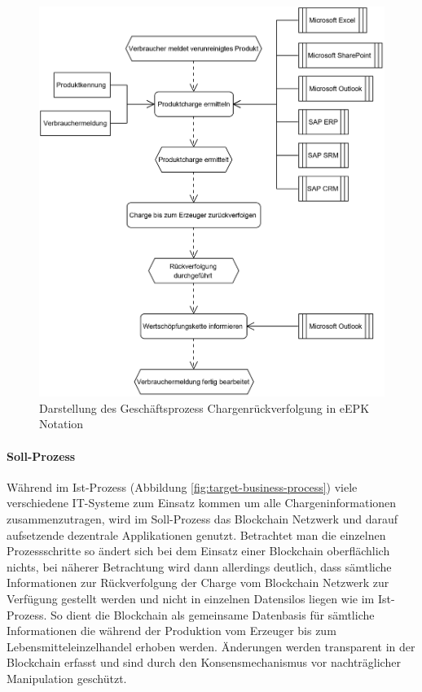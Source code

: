 \begin{figure}[H]
	\centering
	\includegraphics[width=1\linewidth]{pictures/business-process-epc-diagram-bw}
	\caption[Darstellung des Geschäftsprozess Chargenrückverfolgung in eEPK Notation]{Darstellung des Geschäftsprozess Chargenrückverfolgung in eEPK Notation}
	\label{fig:business-process-epc-diagramm}
\end{figure}

\paragraph{Soll-Prozess}
Während im Ist-Prozess (Abbildung \ref{fig:target-business-process}) viele verschiedene IT-Systeme zum Einsatz kommen um alle Chargeninformationen zusammenzutragen, wird im Soll-Prozess das Blockchain Netzwerk und darauf aufsetzende dezentrale Applikationen genutzt. Betrachtet man die einzelnen Prozessschritte so ändert sich bei dem Einsatz einer Blockchain oberflächlich nichts, bei näherer Betrachtung wird dann allerdings deutlich, dass sämtliche Informationen zur Rückverfolgung der Charge vom Blockchain Netzwerk zur Verfügung gestellt werden und nicht in einzelnen Datensilos liegen wie im Ist-Prozess. So dient die Blockchain als gemeinsame Datenbasis für sämtliche Informationen die während der Produktion vom Erzeuger bis zum Lebensmitteleinzelhandel erhoben werden. Änderungen werden transparent in der Blockchain erfasst und sind durch den Konsensmechanismus vor nachträglicher Manipulation geschützt. 

